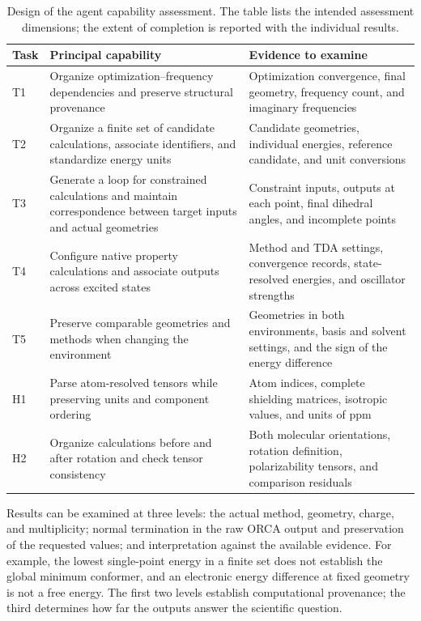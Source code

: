 \begin{table}[htbp]
  \centering\small
  \caption{Design of the agent capability assessment.
  The table lists the intended assessment dimensions; the extent of completion is reported with the individual results.}
  \label{tab:agent-capability-design}
  \begin{tabularx}{\linewidth}{lYY}
    \toprule
    Task & Principal capability & Evidence to examine\\
    \midrule
    T1 & Organize optimization--frequency dependencies and preserve structural provenance
       & Optimization convergence, final geometry, frequency count, and imaginary frequencies\\
    T2 & Organize a finite set of candidate calculations, associate identifiers, and standardize energy units
       & Candidate geometries, individual energies, reference candidate, and unit conversions\\
    T3 & Generate a loop for constrained calculations and maintain correspondence between target inputs and actual geometries
       & Constraint inputs, outputs at each point, final dihedral angles, and incomplete points\\
    T4 & Configure native property calculations and associate outputs across excited states
       & Method and TDA settings, convergence records, state-resolved energies, and oscillator strengths\\
    T5 & Preserve comparable geometries and methods when changing the environment
       & Geometries in both environments, basis and solvent settings, and the sign of the energy difference\\
    H1 & Parse atom-resolved tensors while preserving units and component ordering
       & Atom indices, complete shielding matrices, isotropic values, and units of ppm\\
    H2 & Organize calculations before and after rotation and check tensor consistency
       & Both molecular orientations, rotation definition, polarizability tensors, and comparison residuals\\
    \bottomrule
  \end{tabularx}
\end{table}

\FloatBarrier

Results can be examined at three levels: the actual method, geometry, charge, and multiplicity;
normal termination in the raw ORCA output and preservation of the requested values;
and interpretation against the available evidence.
For example, the lowest single-point energy in a finite set does not establish the global minimum conformer,
and an electronic energy difference at fixed geometry is not a free energy.
The first two levels establish computational provenance; the third determines how far the outputs answer the scientific question.

